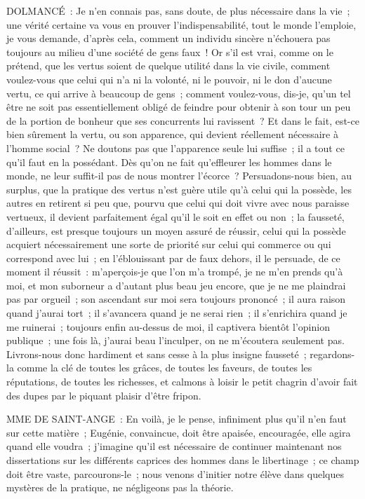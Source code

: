 \documentclass[french,twoside]{book} %
\begin{document}
DOLMANCÉ : Je n’en connais pas, sans doute, de plus nécessaire dans la vie ; une vérité certaine va vous en prouver l’indispensabilité, tout le monde l’emploie, je vous demande, d’après cela, comment un individu sincère n’échouera pas toujours au milieu d’une société de gens faux ! Or s’il est vrai, comme on le prétend, que les vertus soient de quelque utilité dans la vie civile, comment voulez-vous que celui qui n’a ni la volonté, ni le pouvoir, ni le don d’aucune vertu, ce qui arrive à beaucoup de gens ; comment voulez-vous, dis-je, qu’un tel être ne soit pas essentiellement obligé de feindre pour obtenir à son tour un peu de la portion de bonheur que ses concurrents lui ravissent ? Et dans le fait, est-ce bien sûrement la vertu, ou son apparence, qui devient réellement nécessaire à l’homme social ? Ne doutons pas que l’apparence seule lui suffise ; il a tout ce qu’il faut en la possédant. Dès qu’on ne fait qu’effleurer les hommes dans le monde, ne leur suffit-il pas de nous montrer l’écorce ? Persuadons-nous bien, au surplus, que la pratique des vertus n’est guère utile qu’à celui qui la possède, les autres en retirent si peu que, pourvu que celui qui doit vivre avec nous paraisse vertueux, il devient parfaitement égal qu’il le soit en effet ou non ; la fausseté, d’ailleurs, est presque toujours un moyen assuré de réussir, celui qui la possède acquiert nécessairement une sorte de priorité sur celui qui commerce ou qui correspond avec lui ; en l’éblouissant par de faux dehors, il le persuade, de ce moment il réussit : m’aperçois-je que l’on m’a trompé, je ne m’en prends qu’à moi, et mon suborneur a d’autant plus beau jeu encore, que je ne me plaindrai pas par orgueil ; son ascendant sur moi sera toujours prononcé ; il aura raison quand j’aurai tort ; il s’avancera quand je ne serai rien ; il s’enrichira quand je me ruinerai ; toujours enfin au-dessus de moi, il captivera bientôt l’opinion publique ; une fois là, j’aurai beau l’inculper, on ne m’écoutera seulement pas. Livrons-nous donc hardiment et sans cesse à la plus insigne fausseté ; regardons-la comme la clé de toutes les grâces, de toutes les faveurs, de toutes les réputations, de toutes les richesses, et calmons à loisir le petit chagrin d’avoir fait des dupes par le piquant plaisir d’être fripon.\par
MME DE SAINT-ANGE : En voilà, je le pense, infiniment plus qu’il n’en faut sur cette matière ; Eugénie, convaincue, doit être apaisée, encouragée, elle agira quand elle voudra ; j’imagine qu’il est nécessaire de continuer maintenant nos dissertations sur les différents caprices des hommes dans le libertinage ; ce champ doit être vaste, parcourons-le ; nous venons d’initier notre élève dans quelques mystères de la pratique, ne négligeons pas la théorie.\par
\end{document}
